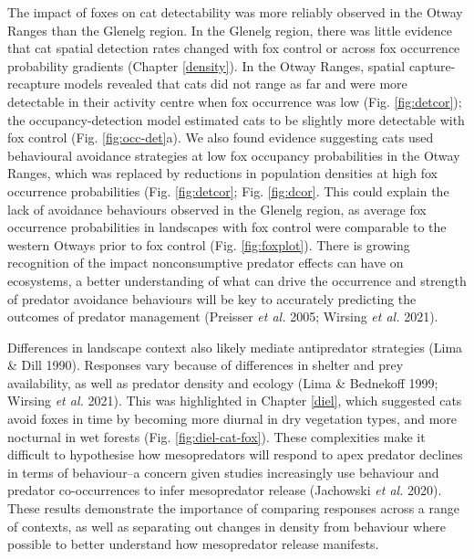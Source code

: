 \documentclass[11pt,a4paper,titlepage,twoside,openright]{style/unimelbthesis}
\begin{document}
\begin{mainmatter}
The impact of foxes on cat detectability was more reliably observed in the Otway Ranges than the Glenelg region. In the Glenelg region, there was little evidence that cat spatial detection rates changed with fox control or across fox occurrence probability gradients (Chapter \ref{density}). In the Otway Ranges, spatial capture-recapture models revealed that cats did not range as far and were more detectable in their activity centre when fox occurrence was low (Fig. \ref{fig:detcor}); the occupancy-detection model estimated cats to be slightly more detectable with fox control (Fig. \ref{fig:occ-det}a). We also found evidence suggesting cats used behavioural avoidance strategies at low fox occupancy probabilities in the Otway Ranges, which was replaced by reductions in population densities at high fox occurrence probabilities (Fig. \ref{fig:detcor}; Fig. \ref{fig:dcor}. This could explain the lack of avoidance behaviours observed in the Glenelg region, as average fox occurrence probabilities in landscapes with fox control were comparable to the western Otways prior to fox control (Fig. \ref{fig:foxplot}). There is growing recognition of the impact nonconsumptive predator effects can have on ecosystems, a better understanding of what can drive the occurrence and strength of predator avoidance behaviours will be key to accurately predicting the outcomes of predator management (Preisser \emph{et al.} 2005; Wirsing \emph{et al.} 2021).

Differences in landscape context also likely mediate antipredator strategies (Lima \& Dill 1990). Responses vary because of differences in shelter and prey availability, as well as predator density and ecology (Lima \& Bednekoff 1999; Wirsing \emph{et al.} 2021). This was highlighted in Chapter \ref{diel}, which suggested cats avoid foxes in time by becoming more diurnal in dry vegetation types, and more nocturnal in wet forests (Fig. \ref{fig:diel-cat-fox}). These complexities make it difficult to hypothesise how mesopredators will respond to apex predator declines in terms of behaviour--a concern given studies increasingly use behaviour and predator co-occurrences to infer mesopredator release (Jachowski \emph{et al.} 2020). These results demonstrate the importance of comparing responses across a range of contexts, as well as separating out changes in density from behaviour where possible to better understand how mesopredator release manifests.


\end{mainmatter}
\end{document}
